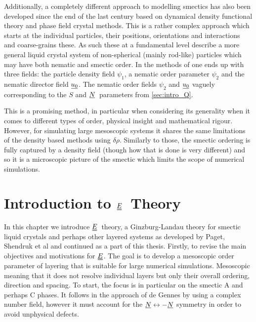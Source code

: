 \documentclass[12pt]{article}
\newcommand{\suf}[2]{\stackunder[0.5pt]{\stackunder[1pt]{\ensuremath{#1}}{\rule{\widthof{\ensuremath{#2}}*\real{0.9}}{.1ex}}}{}}
\newcommand{\duf}[2]{\stackunder[0.5pt]{\stackunder[0.8pt]{\stackunder[1pt]{\ensuremath{#1}}{\rule{\widthof{\ensuremath{#2}}*\real{0.9}}{.1ex}}}{\rule{\widthof{\ensuremath{#2}}*\real{0.9}}{.1ex}}}{}}
\newcommand{\su}[1]{\suf{#1}{#1}}
\newcommand{\du}[1]{\duf{#1}{#1}}
\newcommand{\NN}{\ensuremath{\su{N}}}
\newcommand{\EE}{\ensuremath{\du{E}}}
\begin{document}
        Additionally, a completely different approach to modelling smectics has also been developed since the end of the last century based on dynamical density functional theory and phase field crystal methods\cite{lowenPhasefieldcrystalModelLiquid2010,elderModelingElasticPlastic2004,achimStabilityLiquidCrystalline2011,vitralPhasefieldModelWeakly2021,nestlerActiveSmecticsSphere2023}.
        This is a rather complex approach which starts at the individual particles, their positions, orientations and interactions and coarse-grains these.
        As such these at a fundamental level describe a more general liquid crystal system of non-spherical (mainly rod-like) particles which may have both nematic and smectic order.
        In the methods of \cite{lowenPhasefieldcrystalModelLiquid2010} one ends up with three fields: the particle density field $\psi_1$, a nematic order parameter $\psi_2$ and the nematic director field $\su{u_0}$.
        The nematic order fields $\psi_2$ and $\su{u_0}$ vaguely corresponding to the $S$ and \NN\ parameters from \cref{sec:intro_Q}.

        This is a promising method, in particular when considering its generality when it comes to different types of order, physical insight and mathematical rigour.
        However, for simulating large mesoscopic systems it shares the same limitations of the density based methods using $\delta\rho$.
        Similarly to those, the smectic ordering is fully captured by a density field (though how that is done is very different) and so it is a microscopic picture of the smectic which limits the scope of numerical simulations.


\section{Introduction to \EE\ Theory}\label{sec:Ei}
    In this chapter we introduce \EE\ theory, a Ginzburg-Landau theory for smectic liquid crystals and perhaps other layered systems as developed by Paget, Shendruk et al\cite{pagetComplexTensorsSimple2023,pagetSmecticLayeringLandau2022,pagetComplextensorTheorySimple2023} and continued as a part of this thesis.
    Firstly, to revise the main objectives and motivations for \EE.
    The goal is to develop a mesoscopic order parameter of layering that is suitable for large numerical simulations.
    Mesoscopic meaning that it does not resolve individual layers but only their overall ordering, direction and spacing.
    To start, the focus is in particular on the smectic A and perhaps C phases.
    It follows in the approach of de Gennes by using a complex number field, however it must account for the $\su{N} \leftrightarrow -\su{N}$ symmetry in order to avoid unphysical defects.
\end{document}
